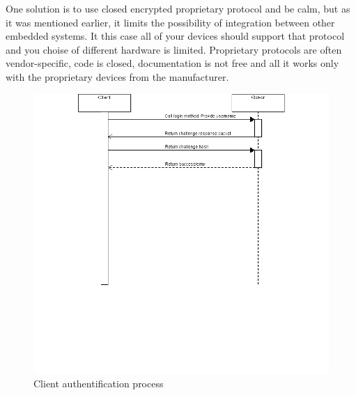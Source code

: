  One solution is to use closed encrypted proprietary
protocol and be calm, but as it was mentioned earlier, it limits the possibility of integration
between other embedded systems. It this case all of your devices should support
that protocol and you choise of different hardware is limited. Proprietary
protocols are often vendor-specific, code is closed, documentation is not free
and all it works only with the proprietary devices from the manufacturer.


\begin{center}
 \begin{figure}[h]
	\includegraphics[width=\textwidth]{../images/implementation/embedded_server/SequenceDiagram.png}
	\caption{Client authentification process}
	\label{fig:embedded_server_login_auth}
 \end{figure}
\end{center}


